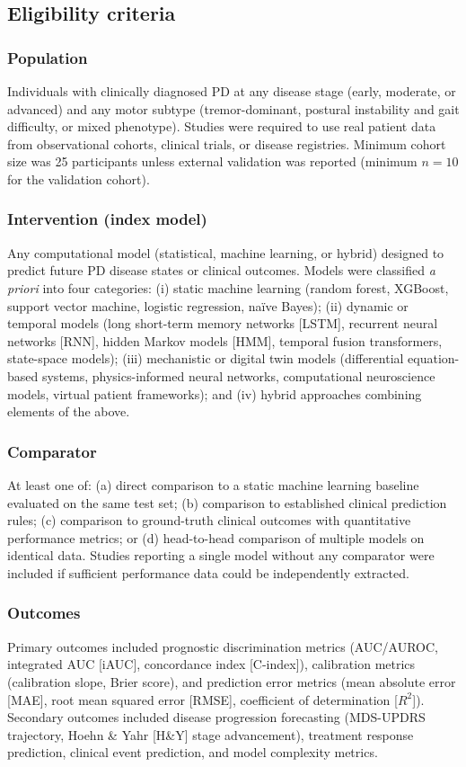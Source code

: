 \documentclass[11pt,a4paper]{article}
\begin{document}
\subsection{Eligibility criteria}

\subsubsection{Population}
Individuals with clinically diagnosed PD at any disease stage (early, moderate, or advanced) and any motor subtype (tremor-dominant, postural instability and gait difficulty, or mixed phenotype). Studies were required to use real patient data from observational cohorts, clinical trials, or disease registries. Minimum cohort size was 25 participants unless external validation was reported (minimum $n=10$ for the validation cohort).

\subsubsection{Intervention (index model)}
Any computational model (statistical, machine learning, or hybrid) designed to predict future PD disease states or clinical outcomes. Models were classified \textit{a priori} into four categories: (i) static machine learning (random forest, XGBoost, support vector machine, logistic regression, na\"ive Bayes); (ii) dynamic or temporal models (long short-term memory networks [LSTM], recurrent neural networks [RNN], hidden Markov models [HMM], temporal fusion transformers, state-space models); (iii) mechanistic or digital twin models (differential equation-based systems, physics-informed neural networks, computational neuroscience models, virtual patient frameworks); and (iv) hybrid approaches combining elements of the above.

\subsubsection{Comparator}
At least one of: (a) direct comparison to a static machine learning baseline evaluated on the same test set; (b) comparison to established clinical prediction rules; (c) comparison to ground-truth clinical outcomes with quantitative performance metrics; or (d) head-to-head comparison of multiple models on identical data. Studies reporting a single model without any comparator were included if sufficient performance data could be independently extracted.

\subsubsection{Outcomes}
Primary outcomes included prognostic discrimination metrics (AUC/AUROC, integrated AUC [iAUC], concordance index [C-index]), calibration metrics (calibration slope, Brier score), and prediction error metrics (mean absolute error [MAE], root mean squared error [RMSE], coefficient of determination [$R^2$]). Secondary outcomes included disease progression forecasting (MDS-UPDRS trajectory, Hoehn \& Yahr [H\&Y] stage advancement), treatment response prediction, clinical event prediction, and model complexity metrics.
\end{document}
